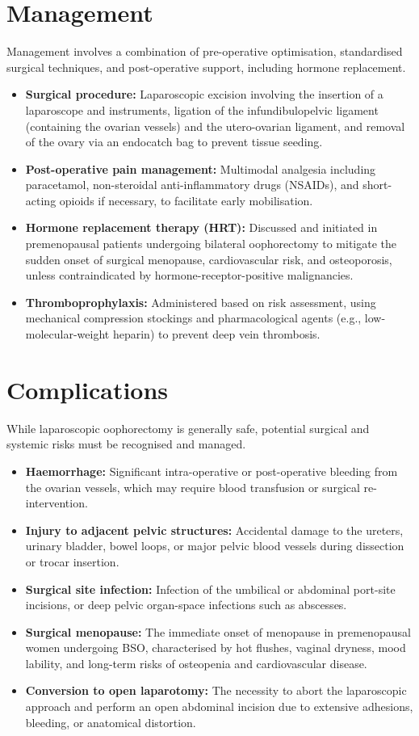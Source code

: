 \section*{Management}
Management involves a combination of pre-operative optimisation, standardised surgical techniques, and post-operative support, including hormone replacement.
\begin{itemize}
    \item \textbf{Surgical procedure:} Laparoscopic excision involving the insertion of a laparoscope and instruments, ligation of the infundibulopelvic ligament (containing the ovarian vessels) and the utero-ovarian ligament, and removal of the ovary via an endocatch bag to prevent tissue seeding.
    \item \textbf{Post-operative pain management:} Multimodal analgesia including paracetamol, non-steroidal anti-inflammatory drugs (NSAIDs), and short-acting opioids if necessary, to facilitate early mobilisation.
    \item \textbf{Hormone replacement therapy (HRT):} Discussed and initiated in premenopausal patients undergoing bilateral oophorectomy to mitigate the sudden onset of surgical menopause, cardiovascular risk, and osteoporosis, unless contraindicated by hormone-receptor-positive malignancies.
    \item \textbf{Thromboprophylaxis:} Administered based on risk assessment, using mechanical compression stockings and pharmacological agents (e.g., low-molecular-weight heparin) to prevent deep vein thrombosis.
\end{itemize}

\section*{Complications}
While laparoscopic oophorectomy is generally safe, potential surgical and systemic risks must be recognised and managed.
\begin{itemize}
    \item \textbf{Haemorrhage:} Significant intra-operative or post-operative bleeding from the ovarian vessels, which may require blood transfusion or surgical re-intervention.
    \item \textbf{Injury to adjacent pelvic structures:} Accidental damage to the ureters, urinary bladder, bowel loops, or major pelvic blood vessels during dissection or trocar insertion.
    \item \textbf{Surgical site infection:} Infection of the umbilical or abdominal port-site incisions, or deep pelvic organ-space infections such as abscesses.
    \item \textbf{Surgical menopause:} The immediate onset of menopause in premenopausal women undergoing BSO, characterised by hot flushes, vaginal dryness, mood lability, and long-term risks of osteopenia and cardiovascular disease.
    \item \textbf{Conversion to open laparotomy:} The necessity to abort the laparoscopic approach and perform an open abdominal incision due to extensive adhesions, bleeding, or anatomical distortion.
\end{itemize}

